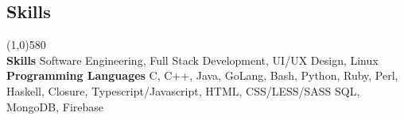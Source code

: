 \documentclass[9pt]{article}
\begin{document}
  \vspace{-16pt}
  \subsection*{Skills}
    \vspace{-16pt}
    \line(1,0){580}\\
    \textbf{Skills}
    Software Engineering,
    Full Stack Development,
    UI/UX Design,
    Linux
    \\
    \textbf{Programming Languages}
    C,
    C++,
    Java,
    GoLang,
    Bash,
    Python,
    Ruby,
    Perl,
    Haskell,
    Closure,
    Typescript/Javascript,
    HTML,
    CSS/LESS/SASS
    SQL,
    MongoDB,
    Firebase
    \\
\end{document}
